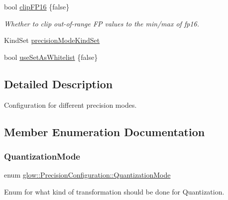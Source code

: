 \begin{DoxyCompactItemize}
\mbox{\label{structglow_1_1_precision_configuration_a65953dbf7a7d68736f337ee9d0e11969}} 
bool \hyperlink{structglow_1_1_precision_configuration_a65953dbf7a7d68736f337ee9d0e11969}{clip\+F\+P16} \{false\}
\begin{DoxyCompactList}\small\item\em Whether to clip out-\/of-\/range FP values to the min/max of fp16. \end{DoxyCompactList}\item 
Kind\+Set \hyperlink{structglow_1_1_precision_configuration_aa82990fcfc9b6b3cac365d037b962852}{precision\+Mode\+Kind\+Set}
\item 
bool \hyperlink{structglow_1_1_precision_configuration_a1bfcccc0bdb4c783ab15ba37677f8582}{use\+Set\+As\+Whitelist} \{false\}
\end{DoxyCompactItemize}


\subsection{Detailed Description}
Configuration for different precision modes. 

\subsection{Member Enumeration Documentation}
\mbox{\label{structglow_1_1_precision_configuration_a9a40e5e2126e4c6f3e8fe3bab25ff12c}} 
\subsubsection{\texorpdfstring{Quantization\+Mode}{QuantizationMode}}
{\footnotesize\ttfamily enum \hyperlink{structglow_1_1_precision_configuration_a9a40e5e2126e4c6f3e8fe3bab25ff12c}{glow\+::\+Precision\+Configuration\+::\+Quantization\+Mode}\hspace{0.3cm}{\ttfamily [strong]}}



Enum for what kind of transformation should be done for Quantization. 

